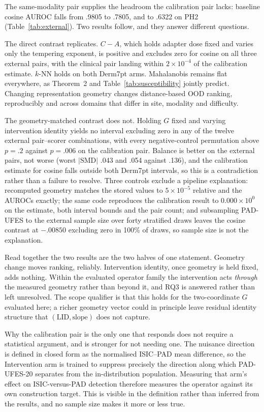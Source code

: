 \documentclass[11pt,a4paper]{article}
\begin{document}
The same-modality pair supplies the headroom the calibration pair lacks: baseline cosine AUROC falls from .9805 to .7805, and to .6322 on PH2 (Table~\ref{tab:external}). Two results follow, and they answer different questions.

The direct contrast replicates. $C-A$, which holds adapter dose fixed and varies only the tempering exponent, is positive and excludes zero for cosine on all three external pairs, with the clinical pair landing within $2\times10^{-4}$ of the calibration estimate. $k$-NN holds on both Derm7pt arms. Mahalanobis remains flat everywhere, as Theorem~2 and Table~\ref{tab:susceptibility} jointly predict. Changing representation geometry changes distance-based OOD ranking, reproducibly and across domains that differ in site, modality and difficulty.

The geometry-matched contrast does not. Holding $G$ fixed and varying intervention identity yields no interval excluding zero in any of the twelve external pair--scorer combinations, with every negative-control permutation above $p=.2$ against $p=.006$ on the calibration pair. Balance is better on the external pairs, not worse (worst $|\mathrm{SMD}|$ .043 and .054 against .136), and the calibration estimate for cosine falls outside both Derm7pt intervals, so this is a contradiction rather than a failure to resolve. Three controls exclude a pipeline explanation: recomputed geometry matches the stored values to $5\times10^{-5}$ relative and the AUROCs exactly; the same code reproduces the calibration result to $0.000\times10^{0}$ on the estimate, both interval bounds and the pair count; and subsampling PAD-UFES to the external sample size over forty stratified draws leaves the cosine contrast at $-.00850$ excluding zero in 100\% of draws, so sample size is not the explanation.

Read together the two results are the two halves of one statement. Geometry change moves ranking, reliably. Intervention identity, once geometry is held fixed, adds nothing. Within the evaluated operator family the intervention acts \emph{through} the measured geometry rather than beyond it, and RQ3 is answered rather than left unresolved. The scope qualifier is that this holds for the two-coordinate $G$ evaluated here; a richer geometry vector could in principle leave residual identity structure that $(\mathrm{LID},\text{slope})$ does not capture.

Why the calibration pair is the only one that responds does not require a
statistical argument, and is stronger for not needing one. The nuisance
direction is defined in closed form as the normalised ISIC--PAD mean
difference, so the Intervention arm is trained to suppress precisely the
direction along which PAD-UFES-20 separates from the in-distribution
population. Measuring that arm's effect on ISIC-versus-PAD detection therefore
measures the operator against its own construction target. This is visible in
the definition rather than inferred from the results, and no sample size makes
it more or less true.
\end{document}
